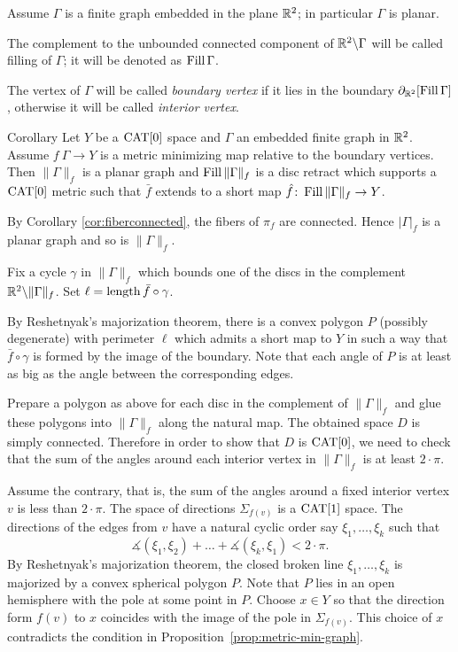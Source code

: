 \documentclass[a4paper,10pt]{amsart}
\begin{document}
Assume $\Gamma$ is a finite graph embedded in the plane $\mathbb{R}^2$;
in particular $\Gamma$ is planar.

The complement to the unbounded connected component of $\mathbb{R}^2\backslash\Gamma$ will be called filling of $\Gamma$;
it will be denoted as $\mathop{\rm Fill}\Gamma$.

The vertex of $\Gamma$ will be called \emph{boundary vertex}
if it lies in the boundary $\partial_{\mathbb{R}^2}[\mathop{\rm Fill}\Gamma]$,
otherwise it will be called \emph{interior vertex}.

\begin{thm}{Corollary}\label{cor:planar-minimizing-graph}
Let $Y$ be a $\mathop{\rm CAT}\nolimits[0]$ space and
$\Gamma$ an embedded finite graph in $\mathbb{R}^2$.
Assume $f\:\Gamma\to Y$ is a metric minimizing map relative to the boundary vertices. 
Then $\|\Gamma\|_f$ is a planar graph and
$\mathop{\rm Fill}\|\Gamma\|_f$ is a disc retract which supports a $\mathop{\rm CAT}\nolimits[0]$ metric such that 
 $\bar f$ extends to a short map $\hat f\colon\mathop{\rm Fill}\|\Gamma\|_f\to Y$.
\end{thm}

By Corollary \ref{cor:fiberconnected}, the fibers of $\pi_f$ are connected. Hence $|\Gamma|_f$ is 
a planar graph and so is $\|\Gamma\|_f$.


Fix a cycle $\gamma$ in $\|\Gamma\|_f$ which bounds one of the discs in the complement $\mathbb{R}^2\backslash \|\Gamma\|_f$.
Set $\ell=\mathop{\rm length}\nolimits \bar f\circ\gamma$.

By Reshetnyak's majorization theorem, there is a convex polygon $P$ (possibly degenerate) with perimeter $\ell$ which admits 
a short map to $Y$ in such a way that $\bar f\circ\gamma$ is formed by the image of the boundary.
Note that each angle of $P$ is at least as big as 
the angle between the corresponding edges.

Prepare a polygon as above for each disc in the complement of $\|\Gamma\|_f$
and glue these polygons into $\|\Gamma\|_f$ along the natural map.
The obtained space $D$ is simply connected.
Therefore in order to show that $D$ is $\mathop{\rm CAT}\nolimits[0]$,
we need to check that the sum of the angles around each interior vertex in $\|\Gamma\|_f$ is at least $2\cdot\pi$.


Assume the contrary, that is, 
the sum of the angles around a fixed interior vertex $v$ is less than $2\cdot\pi$.
The space of directions $\Sigma_{f(v)}$ is a $\mathop{\rm CAT}\nolimits[1]$ space.
The directions of the edges from $v$ have a natural
cyclic order say $\xi_1,\dots,\xi_k$
such that
\[\measuredangle(\xi_1,\xi_2)+\dots+\measuredangle(\xi_k,\xi_1)<2\cdot\pi.\]
By Reshetnyak's majorization theorem,
the closed broken line $\xi_1,\dots,\xi_k$ is majorized by a convex spherical polygon $P$.
Note that $P$ lies in an open hemisphere with the pole  at some point in $P$.
Choose $x\in Y$ so that the direction form $f(v)$ to $x$ coincides with the image of the pole in $\Sigma_{f(v)}$.
This choice of $x$ contradicts the condition in Proposition~\ref{prop:metric-min-graph}.
\end{document}
